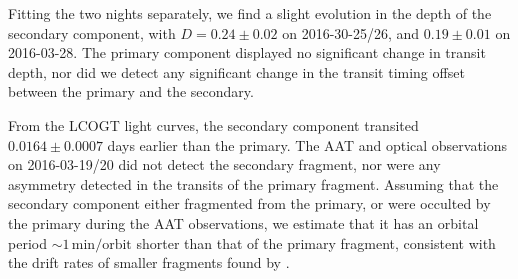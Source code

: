 \documentclass[useAMS,usenatbib]{mn2e}
\begin{document}
Fitting the two nights separately, we find a slight evolution in the depth of the secondary component, with $D=0.24\pm0.02$ on 2016-30-25/26, and $0.19\pm0.01$ on 2016-03-28. The primary component displayed no significant change in transit depth, nor did we detect any significant change in the transit timing offset between the primary and the secondary.

From the LCOGT light curves, the secondary component transited $0.0164 \pm 0.0007$ days earlier than the primary. The AAT and optical observations on 2016-03-19/20 did not detect the secondary fragment, nor were any asymmetry detected in the transits of the primary fragment. Assuming that the secondary component either fragmented from the primary, or were occulted by the primary during the AAT observations, we estimate that it has an orbital period $\sim 1\,\mathrm{min/orbit}$ shorter than that of the primary fragment, consistent with the drift rates of smaller fragments found by \citet{2016MNRAS.tmp..406R}.   
\end{document}
